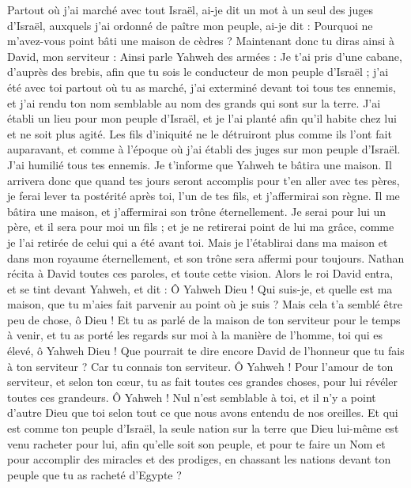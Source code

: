 \begin{multicols}{2}
Partout où j'ai marché avec tout Israël, ai-je dit un mot à un seul des juges d'Israël, auxquels j'ai ordonné de paître mon peuple, ai-je dit : Pourquoi ne m'avez-vous point bâti une maison de cèdres ?
Maintenant donc tu diras ainsi à David, mon serviteur : Ainsi parle Yahweh des armées : Je t'ai pris d'une cabane, d'auprès des brebis, afin que tu sois le conducteur de mon peuple d'Israël ;
j'ai été avec toi partout où tu as marché, j'ai exterminé devant toi tous tes ennemis, et j'ai rendu ton nom semblable au nom des grands qui sont sur la terre.
J'ai établi un lieu pour mon peuple d'Israël, et je l'ai planté afin qu'il habite chez lui et ne soit plus agité. Les fils d'iniquité ne le détruiront plus comme ils l'ont fait auparavant,
et comme à l'époque où j'ai établi des juges sur mon peuple d'Israël. J'ai humilié tous tes ennemis. Je t'informe que Yahweh te bâtira une maison.
Il arrivera donc que quand tes jours seront accomplis pour t'en aller avec tes pères, je ferai lever ta postérité après toi, l'un de tes fils, et j'affermirai son règne.
Il me bâtira une maison, et j'affermirai son trône éternellement.
Je serai pour lui un père, et il sera pour moi un fils ; et je ne retirerai point de lui ma grâce, comme je l'ai retirée de celui qui a été avant toi.
Mais je l'établirai dans ma maison et dans mon royaume éternellement, et son trône sera affermi pour toujours.
Nathan récita à David toutes ces paroles, et toute cette vision.
Alors le roi David entra, et se tint devant Yahweh, et dit : Ô Yahweh Dieu ! Qui suis-je, et quelle est ma maison, que tu m'aies fait parvenir au point où je suis ?
Mais cela t'a semblé être peu de chose, ô Dieu ! Et tu as parlé de la maison de ton serviteur pour le temps à venir, et tu as porté les regards sur moi à la manière de l'homme, toi qui es élevé, ô Yahweh Dieu !
Que pourrait te dire encore David de l'honneur que tu fais à ton serviteur ? Car tu connais ton serviteur.
Ô Yahweh ! Pour l'amour de ton serviteur, et selon ton cœur, tu as fait toutes ces grandes choses, pour lui révéler toutes ces grandeurs.
Ô Yahweh ! Nul n'est semblable à toi, et il n'y a point d'autre Dieu que toi selon tout ce que nous avons entendu de nos oreilles.
Et qui est comme ton peuple d'Israël, la seule nation sur la terre que Dieu lui-même est venu racheter pour lui, afin qu'elle soit son peuple, et pour te faire un Nom et pour accomplir des miracles et des prodiges, en chassant les nations devant ton peuple que tu as racheté d'Egypte ?

\end{multicols}
